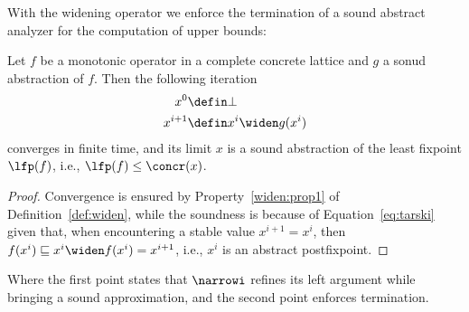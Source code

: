 With the widening operator we enforce the termination of a sound
abstract analyzer for the computation of upper bounds:

\begin{theorem}\label{th:convergence}
  Let \(f\) be a monotonic operator in a complete concrete lattice and
  \(g\) a sonud abstraction of \(f\). Then the following iteration
  \begin{align*}
    x^0 & \defin \bot \\
    x^{i+1} & \defin x^i \widen g(x^i)
  \end{align*}
  converges in finite time, and its limit \(x\) is a sound abstraction
  of the least fixpoint \(\lfp(f)\), i.e., \(\lfp(f) \leq \concr(x)\).
\end{theorem}

\begin{proof}
  Convergence is ensured by Property~\ref{widen:prop1} of
  Definition~\ref{def:widen}, while the soundness is because of
  Equation~\eqref{eq:tarski} given that, when encountering a stable
  value \(x^{i+1} = x^i\), then
  \(f(x^i) \sqsubseteq x^i \widen f(x^i) = x^{i+1}\), i.e., \(x^i\) is
  an abstract postfixpoint.
\end{proof}

Where the first point states that \(\narrowi\) refines its left
argument while bringing a sound approximation, and the second point
enforces termination.

